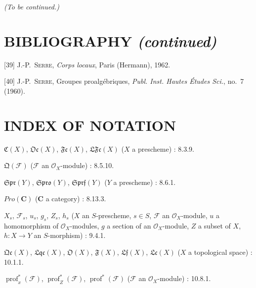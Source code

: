 
\begin{center}
\emph{(To be continued.)}
\end{center}

\clearpage
{}
{}
\section*{BIBLIOGRAPHY \textnormal{\emph{(continued)}}}

\begingroup
\small
\setlength{\parindent}{0pt}
\setlength{\parskip}{3pt}
[39] J.-P.~\textsc{Serre}, \emph{Corps locaux}, Paris (Hermann), 1962.

[40] J.-P.~\textsc{Serre}, Groupes proalgébriques, \emph{Publ. Inst. Hautes Études Sci.}, no.~7 (1960).

\endgroup

\clearpage
{}
{}
\section*{INDEX OF NOTATION}

\begingroup
\small
\setlength{\parindent}{0pt}
\setlength{\parskip}{2pt}

$\mathfrak C(X)$, $\mathfrak{Oc}(X)$, $\mathfrak{Fc}(X)$,
$\mathfrak{LFc}(X)$ ($X$ a prescheme) : 8.3.9.

$\mathfrak Q(\mathcal F)$ ($\mathcal F$ an $\mathcal O_X$-module) : 8.5.10.

$\mathfrak{Spr}(Y)$, $\mathfrak{Spro}(Y)$, $\mathfrak{Sprf}(Y)$
($Y$ a prescheme) : 8.6.1.

$\boldsymbol{\mathit{Pro}}(\boldsymbol{C})$ ($\boldsymbol{C}$ a category) : 8.13.3.

$X_s$, $\mathcal F_s$, $u_s$, $g_s$, $Z_s$, $h_s$
($X$ an $S$-prescheme, $s\in S$, $\mathcal F$ an $\mathcal O_X$-module,
$u$ a homomorphism of $\mathcal O_X$-modules, $g$ a section of an
$\mathcal O_X$-module, $Z$ a subset of $X$, $h:X\to Y$ an $S$-morphism) : 9.4.1.

$\mathfrak{Qc}(X)$, $\mathfrak{Lqc}(X)$, $\mathfrak O(X)$,
$\mathfrak F(X)$, $\mathfrak{Lf}(X)$, $\mathfrak{Lc}(X)$
($X$ a topological space) : 10.1.1.

$\operatorname{prof}^{*}_{x}(\mathcal F)$,
$\operatorname{prof}^{*}_{Z}(\mathcal F)$,
$\operatorname{prof}^{*}(\mathcal F)$
($\mathcal F$ an $\mathcal O_X$-module) : 10.8.1.

